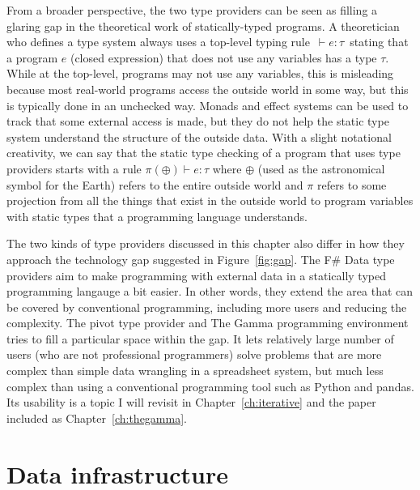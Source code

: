 \documentclass[fleqn,11pt]{report}
\theoremstyle{definition}
\begin{document}
From a broader perspective, the two type providers can be seen as filling a glaring gap in the
theoretical work of statically-typed programs. A theoretician who defines a type system always uses
a top-level typing rule \,$\vdash\!e\!:\!\tau$\, stating that a program $e$ (closed expression) that
does not use any variables has a type $\tau$. While at the top-level, programs may not use any variables,
this is misleading because most real-world programs access the outside world in some way, but
this is typically done in an unchecked way. Monads and effect systems \citep{lucassen-1988-effects,spj-1993-imperative}
can be used to track that some external access is made, but they do not help the static type
system understand the structure of the outside data.
%
With a slight notational creativity, we can say that the static type checking of a program that
uses type providers starts with a rule $\pi(\oplus) \vdash e\!:\!\tau$ where $\oplus$ (used as the
astronomical symbol for the Earth) refers to the entire outside world and $\pi$ refers
to some projection from all the things that exist in the outside world to program variables
with static types that a programming language understands.

The two kinds of type providers discussed in this chapter also differ in how they approach the
technology gap suggested in Figure~\ref{fig:gap}. The F\# Data type providers aim to make
programming with external data in a statically typed programming langauge a bit easier.
In other words, they extend the area that can be covered by conventional programming,
including more users and reducing the complexity. The pivot type provider and The Gamma
programming environment tries to fill a particular space within the gap. It lets relatively
large number of users (who are not professional programmers) solve problems that are more complex
than simple data wrangling in a spreadsheet system, but much less complex than using a conventional
programming tool such as Python and pandas. Its usability is a topic I will revisit in
Chapter~\ref{ch:iterative} and the paper included as Chapter~\ref{ch:thegamma}.


\chapter{Data infrastructure}
\label{ch:infra}
\end{document}
